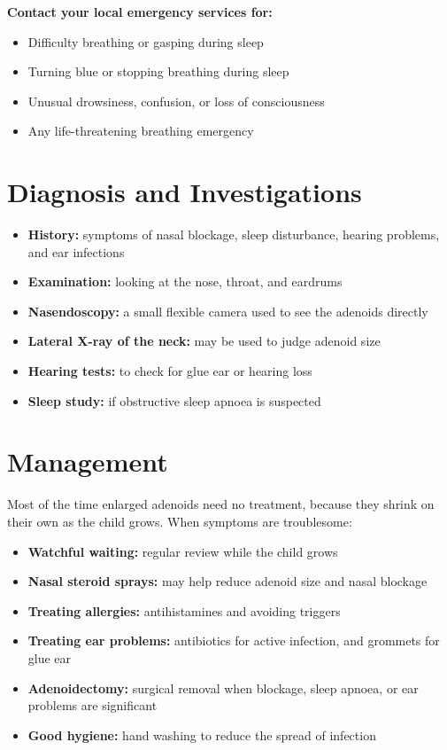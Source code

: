 \textbf{Contact your local emergency services for:}
\begin{itemize}
    \item Difficulty breathing or gasping during sleep
    \item Turning blue or stopping breathing during sleep
    \item Unusual drowsiness, confusion, or loss of consciousness
    \item Any life-threatening breathing emergency
\end{itemize}

\section*{Diagnosis and Investigations}
\begin{itemize}
    \item \textbf{History:} symptoms of nasal blockage, sleep disturbance, hearing problems, and ear infections
    \item \textbf{Examination:} looking at the nose, throat, and eardrums
    \item \textbf{Nasendoscopy:} a small flexible camera used to see the adenoids directly
    \item \textbf{Lateral X-ray of the neck:} may be used to judge adenoid size
    \item \textbf{Hearing tests:} to check for glue ear or hearing loss
    \item \textbf{Sleep study:} if obstructive sleep apnoea is suspected
\end{itemize}

\section*{Management}
Most of the time enlarged adenoids need no treatment, because they shrink on their own as the child grows. When symptoms are troublesome:

\begin{itemize}
    \item \textbf{Watchful waiting:} regular review while the child grows
    \item \textbf{Nasal steroid sprays:} may help reduce adenoid size and nasal blockage
    \item \textbf{Treating allergies:} antihistamines and avoiding triggers
    \item \textbf{Treating ear problems:} antibiotics for active infection, and grommets for glue ear
    \item \textbf{Adenoidectomy:} surgical removal when blockage, sleep apnoea, or ear problems are significant
    \item \textbf{Good hygiene:} hand washing to reduce the spread of infection
\end{itemize}


